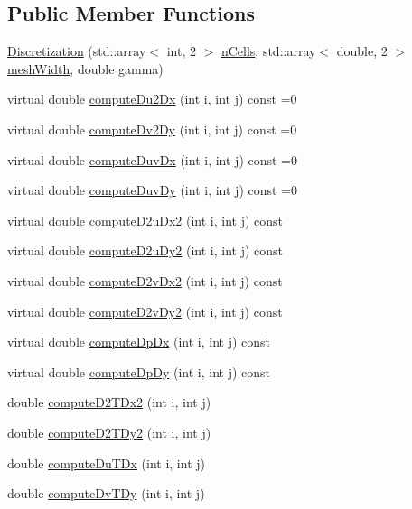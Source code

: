 \subsection*{Public Member Functions}
\begin{DoxyCompactItemize}
\item 
\mbox{\hyperlink{classDiscretization_aec862c98dd3f9a3f15a487b7359d7669}{Discretization}} (std\+::array$<$ int, 2 $>$ \mbox{\hyperlink{classStaggeredGrid_af37816ccb2c46e4a514dedac261897bf}{n\+Cells}}, std\+::array$<$ double, 2 $>$ \mbox{\hyperlink{classStaggeredGrid_a330856d4efe952771daf0753ef84068e}{mesh\+Width}}, double gamma)
\item 
virtual double \mbox{\hyperlink{classDiscretization_acca6bf193e0e91f645d292527299254b}{compute\+Du2\+Dx}} (int i, int j) const =0
\item 
virtual double \mbox{\hyperlink{classDiscretization_a69ba136ab7f8c09d805afca159cab428}{compute\+Dv2\+Dy}} (int i, int j) const =0
\item 
virtual double \mbox{\hyperlink{classDiscretization_ab1c2aa237e13e7c4c9edd429de656795}{compute\+Duv\+Dx}} (int i, int j) const =0
\item 
virtual double \mbox{\hyperlink{classDiscretization_a0bab86aef10a72e01b4f8102a3c91f84}{compute\+Duv\+Dy}} (int i, int j) const =0
\item 
virtual double \mbox{\hyperlink{classDiscretization_a6986501b0b5c96699ff3ac843c1a6ca2}{compute\+D2u\+Dx2}} (int i, int j) const
\item 
virtual double \mbox{\hyperlink{classDiscretization_a446aabc55a9fb4b5cb2f476babc532f9}{compute\+D2u\+Dy2}} (int i, int j) const
\item 
virtual double \mbox{\hyperlink{classDiscretization_a5119047788a34eadf37480e913bdc8ea}{compute\+D2v\+Dx2}} (int i, int j) const
\item 
virtual double \mbox{\hyperlink{classDiscretization_a56678582a049b1b141621e41afff1438}{compute\+D2v\+Dy2}} (int i, int j) const
\item 
virtual double \mbox{\hyperlink{classDiscretization_aed3ad75ad6e647d14f118a12652c01b2}{compute\+Dp\+Dx}} (int i, int j) const
\item 
virtual double \mbox{\hyperlink{classDiscretization_a859f4dc33f0ea91f5e6537be09ce4999}{compute\+Dp\+Dy}} (int i, int j) const
\item 
double \mbox{\hyperlink{classDiscretization_a6d7f1363e1c53d19bc98785f6366b166}{compute\+D2\+T\+Dx2}} (int i, int j)
\item 
double \mbox{\hyperlink{classDiscretization_ae2f9a1e4aedee8838ec4061dad81f3d3}{compute\+D2\+T\+Dy2}} (int i, int j)
\item 
double \mbox{\hyperlink{classDiscretization_a597dfac7c819b87175f1ba6a88ea56bd}{compute\+Du\+T\+Dx}} (int i, int j)
\item 
double \mbox{\hyperlink{classDiscretization_a992543b930d6b4857c219adb8d41acf6}{compute\+Dv\+T\+Dy}} (int i, int j)
\end{DoxyCompactItemize}
